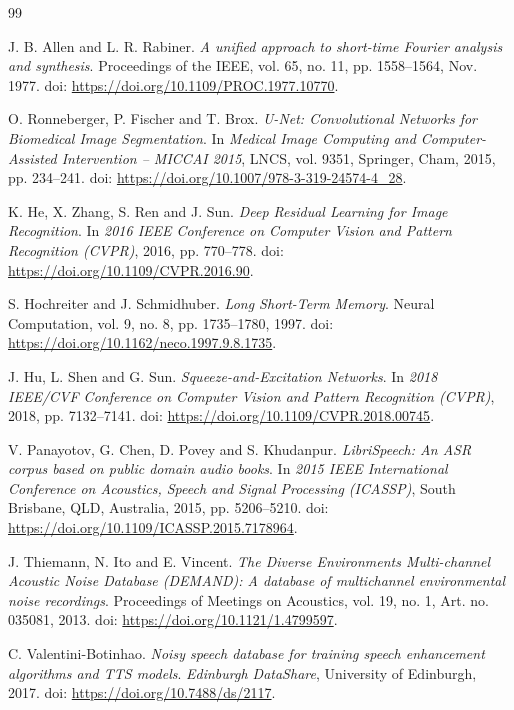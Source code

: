 \documentclass[12pt,a4paper]{report}
\begin{document}
\begin{thebibliography}{99}
\small

J. B. Allen and L. R. Rabiner.
\textit{A unified approach to short-time Fourier analysis and synthesis}.
Proceedings of the IEEE, vol. 65, no. 11, pp. 1558--1564, Nov. 1977.
doi: \url{https://doi.org/10.1109/PROC.1977.10770}.

O. Ronneberger, P. Fischer and T. Brox.
\textit{U-Net: Convolutional Networks for Biomedical Image Segmentation}.
In \textit{Medical Image Computing and Computer-Assisted Intervention --
MICCAI 2015}, LNCS, vol. 9351, Springer, Cham, 2015, pp. 234--241.
doi: \url{https://doi.org/10.1007/978-3-319-24574-4_28}.

K. He, X. Zhang, S. Ren and J. Sun.
\textit{Deep Residual Learning for Image Recognition}.
In \textit{2016 IEEE Conference on Computer Vision and Pattern Recognition (CVPR)},
2016, pp. 770--778.
doi: \url{https://doi.org/10.1109/CVPR.2016.90}.

S. Hochreiter and J. Schmidhuber.
\textit{Long Short-Term Memory}.
Neural Computation, vol. 9, no. 8, pp. 1735--1780, 1997.
doi: \url{https://doi.org/10.1162/neco.1997.9.8.1735}.

J. Hu, L. Shen and G. Sun.
\textit{Squeeze-and-Excitation Networks}.
In \textit{2018 IEEE/CVF Conference on Computer Vision and Pattern Recognition (CVPR)},
2018, pp. 7132--7141.
doi: \url{https://doi.org/10.1109/CVPR.2018.00745}.

V. Panayotov, G. Chen, D. Povey and S. Khudanpur.
\textit{LibriSpeech: An ASR corpus based on public domain audio books}.
In \textit{2015 IEEE International Conference on Acoustics, Speech and Signal Processing (ICASSP)},
South Brisbane, QLD, Australia, 2015, pp. 5206--5210.
doi: \url{https://doi.org/10.1109/ICASSP.2015.7178964}.

J. Thiemann, N. Ito and E. Vincent.
\textit{The Diverse Environments Multi-channel Acoustic Noise Database (DEMAND):
A database of multichannel environmental noise recordings}.
Proceedings of Meetings on Acoustics, vol. 19, no. 1, Art. no. 035081, 2013.
doi: \url{https://doi.org/10.1121/1.4799597}.

C. Valentini-Botinhao.
\textit{Noisy speech database for training speech enhancement algorithms and TTS models}.
\textit{Edinburgh DataShare}, University of Edinburgh, 2017.
doi: \url{https://doi.org/10.7488/ds/2117}.


\end{thebibliography}
\end{document}
